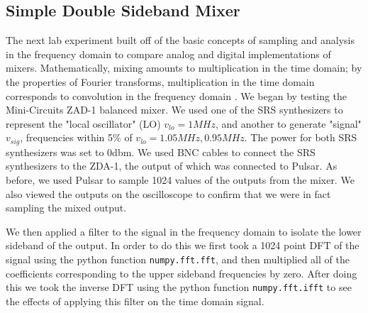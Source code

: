 \documentclass{article}
\begin{document}
  \subsection{Simple Double Sideband Mixer}
  The next lab experiment built off of the basic concepts of sampling and analysis in the frequency domain to compare analog and digital implementations of mixers. Mathematically, mixing amounts to multiplication in the time domain; by the properties of Fourier transforms, multiplication in the time domain corresponds to convolution in the frequency domain \citep{oppenheim}.
  We began by testing the Mini-Circuits ZAD-1 balanced mixer.  We used one of the SRS synthesizers to represent the "local oscillator" (LO) $v_{lo} = 1MHz$, and another to generate "signal" $v_{sig}$, frequencies within 5\% of $v_{lo} = 1.05 MHz, 0.95 MHz$.  The power for both SRS synthesizers was set to 0dbm. We used BNC cables to connect the SRS synthesizers to the ZDA-1, the output of which was connected to Pulsar.  As before, we used Pulsar to sample 1024 values of the outputs from the mixer. We also viewed the outputs on the oscilloscope to confirm that we were in fact sampling the mixed output. 

  We then applied a filter to the signal in the frequency domain to isolate the lower sideband of the output. In order to do this we first took a 1024 point DFT of the signal using the python function \lstinline{numpy.fft.fft}, and then multiplied all of the coefficients corresponding to the upper sideband frequencies by zero. After doing this we took the inverse DFT using the python function \lstinline{numpy.fft.ifft} to see the effects of applying this filter on the time domain signal.
  
\end{document}
